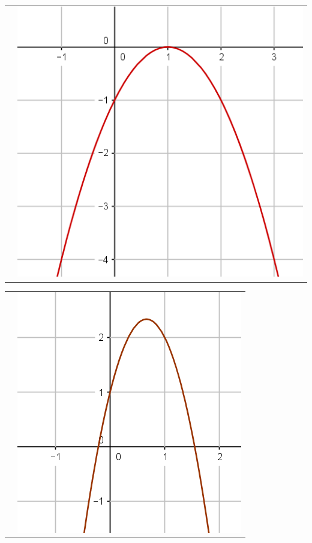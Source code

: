\documentclass[12pt,a4paper]{article}
\begin{document}
\begin{tabular}{cc }
	 &
	
	\includegraphics[scale=0.25]{./img/fig_2}\\
\end{tabular}



\begin{tabular}{ll }
	 &
	
	\includegraphics[scale=0.25]{./img/fig_4}\\
\end{tabular}
	


%
	
\end{document}
